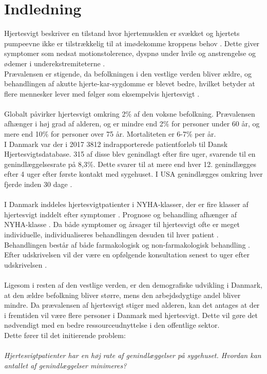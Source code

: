 \chapter{Indledning}\label{indledningen}
Hjertesvigt beskriver en tilstand hvor hjertemusklen er svækket og hjertets pumpeevne ikke er tilstrækkelig til at imødekomme kroppens behov \citep{TSchroeder2016}. Dette giver symptomer som nedsat motionstolerence, dyspnø under hvile og anstrengelse og ødemer i underekstremiteterne \citep{heartfailure}.\\
Prævalensen er stigende, da befolkningen i den vestlige verden bliver ældre, og behandlingen af akutte hjerte-kar-sygdomme er blevet bedre, hvilket betyder at flere mennesker lever med følger som eksempelvis hjertesvigt \citep{heartfailure}\citep{Gheorghiade2009}.\\
\\
Globalt påvirker hjertesvigt omkring 2\% af den voksne befolkning. Prævalensen afhænger i høj grad af alderen, og er mindre end 2\% for personer under 60 år, og mere end 10\% for personer over 75 år. Mortaliteten er 6-7\% per år. \citep{heartfailure}\\
I Danmark var der i 2017 3812 indrapporterede patientforløb til Dansk Hjertesvigtsdatabase. 315 af disse blev genindlagt efter fire uger, svarende til en genindlæggelsesrate på 8,3\%. Dette svarer til at mere end hver 12. genindlægges efter 4 uger efter første kontakt med sygehuset. I USA genindlægges omkring hver fjerde inden 30 dage \citep{keenan2008}. \citep{RKKP2017}\\
\\
I Danmark inddeles hjertesvigtpatienter i NYHA-klasser, der er fire klasser af hjertesvigt inddelt efter symptomer \citep{DCS}. Prognose og behandling afhænger af NYHA-klasse \citep{DCS}. Da både symptomer og årsager til hjertesvigt ofte er meget individuelle, individualiseres behandlingen desuden til hver patient \citep{sstpakke}. Behandlingen består af både farmakologisk og non-farmakologisk behandling \citep{sstpakke}. Efter udskrivelsen vil der være en opfølgende konsultation senest  to uger efter udskrivelsen \citep{Sundhedsstyrelsen2018}.\\
\\
Ligesom i resten af den vestlige verden, er den demografiske udvikling i Danmark, at den ældre befolkning bliver større, mens den arbejdsdygtige andel bliver mindre. Da prævalensen af hjertesvigt stiger med alderen, kan det antages at der i fremtiden vil være flere personer i Danmark med hjertesvigt. Dette vil gøre det nødvendigt med en bedre ressourceudnyttelse i den offentlige sektor. \citep{erfaringsopsamlingTelemedicin}\\
Dette fører til det initierende problem:\\
\\
\textit{Hjertesvigtpatienter har en høj rate af genindlæggelser på sygehuset. Hvordan kan antallet af genindlæggelser minimeres?}



